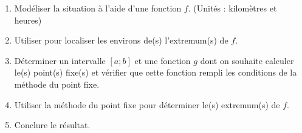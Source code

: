 \documentclass[11pt,a4paper,twoside,greek]{report}
\begin{document}
\begin{boxexstheorieligne}
\begin{enumerate}[label=\textbf{E\thechapter.\arabic*},itemsep=2mm]
\begin{enumerate}[label=\roman*)]
\item Modéliser la situation à l'aide d'une fonction $f$. {\small(Unités : kilomètres et heures)}
\item Utiliser  pour localiser les environs de(s) l'extremum(s) de $f$.
\item Déterminer un intervalle $[a;b]$ et une fonction $g$ dont on souhaite calculer le(s) point(s) fixe(s) et vérifier que cette fonction rempli les conditions de la méthode du point fixe.
\item Utiliser la méthode du point fixe pour déterminer le(s) extremum(s) de $f$.%
\item Conclure le résultat.
\end{enumerate}
\hspace{5mm}



\end{enumerate}
\end{boxexstheorieligne}
\end{document}
